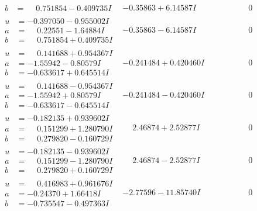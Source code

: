 \documentclass[1p]{elsarticle_modified}
\theoremstyle{definition}
\begin{document}
$$\begin{array}{c|c|c}
\begin{aligned}
b &= \phantom{-}0.751854 - 0.409735 I\end{aligned}
 & -0.35863 + 6.14587 I & \phantom{-0.000000 } 0 \\ \hline\begin{aligned}
u &= -0.397050 - 0.955002 I \\
a &= \phantom{-}0.22551 - 1.64884 I \\
b &= \phantom{-}0.751854 + 0.409735 I\end{aligned}
 & -0.35863 - 6.14587 I & \phantom{-0.000000 } 0 \\ \hline\begin{aligned}
u &= \phantom{-}0.141688 + 0.954367 I \\
a &= -1.55942 - 0.80579 I \\
b &= -0.633617 + 0.645514 I\end{aligned}
 & -0.241484 + 0.420460 I & \phantom{-0.000000 } 0 \\ \hline\begin{aligned}
u &= \phantom{-}0.141688 - 0.954367 I \\
a &= -1.55942 + 0.80579 I \\
b &= -0.633617 - 0.645514 I\end{aligned}
 & -0.241484 - 0.420460 I & \phantom{-0.000000 } 0 \\ \hline\begin{aligned}
u &= -0.182135 + 0.939602 I \\
a &= \phantom{-}0.151299 + 1.280790 I \\
b &= \phantom{-}0.279820 - 0.160729 I\end{aligned}
 & \phantom{-}2.46874 + 2.52877 I & \phantom{-0.000000 } 0 \\ \hline\begin{aligned}
u &= -0.182135 - 0.939602 I \\
a &= \phantom{-}0.151299 - 1.280790 I \\
b &= \phantom{-}0.279820 + 0.160729 I\end{aligned}
 & \phantom{-}2.46874 - 2.52877 I & \phantom{-0.000000 } 0 \\ \hline\begin{aligned}
u &= \phantom{-}0.416983 + 0.961676 I \\
a &= -0.24370 + 1.66418 I \\
b &= -0.735547 - 0.497363 I\end{aligned}
 & -2.77596 - 11.85740 I & \phantom{-0.000000 } 0 \\ \hline\begin{aligned}

\end{aligned}
\end{array}$$
\end{document}
